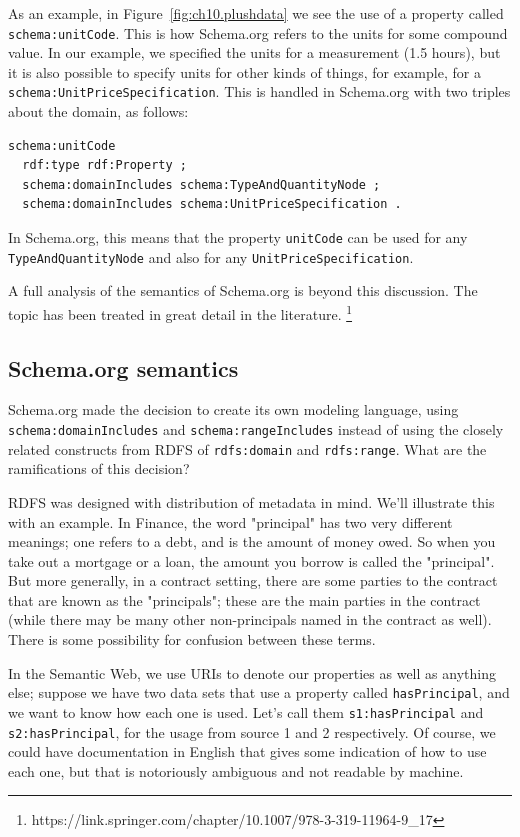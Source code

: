 As an example, in Figure~\ref{fig:ch10.plushdata} we see the use of a property 
called \texttt{schema:unitCode}.  This is how Schema.org refers to the units
for some compound value.  In our example, we specified the units for a measurement
(1.5 hours), but it is also possible to specify units for other kinds of things, 
for example, for a \texttt{schema:UnitPriceSpecification}.  This is 
handled in Schema.org with two triples about the domain, as follows:

\begin{lstlisting}
schema:unitCode
  rdf:type rdf:Property ;
  schema:domainIncludes schema:TypeAndQuantityNode ;
  schema:domainIncludes schema:UnitPriceSpecification .
\end{lstlisting}

In Schema.org, this means that the property \texttt{unitCode} can be used for any 
\texttt{TypeAndQuantityNode} and also for any \texttt{UnitPriceSpecification}.

A full analysis of the semantics of Schema.org is beyond this discussion.  The topic has been treated in 
great detail in the literature. \footnote{https://link.springer.com/chapter/10.1007/978-3-319-11964-9\_17}

\subsection{Schema.org semantics}

Schema.org made the decision to create its own modeling language, using \texttt{schema:domainIncludes} and 
\texttt{schema:rangeIncludes} instead of using the closely related constructs from RDFS of \texttt{rdfs:domain} 
and \texttt{rdfs:range}.  What are the ramifications of this decision? 

RDFS was designed with distribution of metadata in mind.  We'll illustrate this with an example.  In Finance, the 
word "principal" has two very different meanings; one refers to a debt, and is the amount of money owed.  
So when you take out a mortgage or a loan, the amount you borrow is called the "principal".  But more
generally, in a contract setting, there are some parties to the contract that are known as the "principals";
these are the main parties in the contract (while there may be many other non-principals named in the contract
as well).  There is some possibility for confusion between these terms.  

In the Semantic Web, we use URIs to denote our properties as well as anything else; suppose we have two data sets 
that use a property called \texttt{hasPrincipal}, and we want to know how each one is used.  Let's call them
\texttt{s1:hasPrincipal} and \texttt{s2:hasPrincipal}, for the usage from source 1 and 2 respectively.   Of course, 
we could have documentation in English that gives some indication of how to use each one, but that is notoriously
ambiguous and not readable by machine.  

